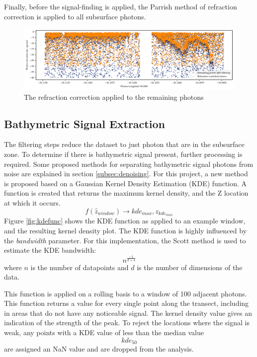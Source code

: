 Finally, before the signal-finding is applied, the Parrish method of refraction correction is applied to all subsurface photons.

\begin{figure}[htbp]
    \centering
    \includegraphics[width=\textwidth]{figures/methodology_refraction.pdf}
    \caption{The refraction correction applied to the remaining photons}
    \label{fig:refraction-photons}
\end{figure}

\subsection{Bathymetric Signal Extraction}\label{sec:kdesignalfinding}

The filtering steps reduce the dataset to just photon that are in the subsurface zone. To determine if there is bathymetric signal present, further processing is required. Some proposed methods for separating bathymetric signal photons from noise are explained in section \ref{subsec:denoising}. For this project, a new method is proposed based on a Gaussian Kernel Density Estimation (KDE) function. A function is created that returns the maximum kernel density, and the Z location at which it occurs. $$ f(\hat{z}_{window}) \rightarrow kde_{max},z_{kde_{max}} $$ Figure \ref{fig:kdefunc} shows the KDE function as applied to an example window, and the resulting kernel density plot. The KDE function is highly influenced by the \emph{bandwidth} parameter. For this implementation, the Scott method \parencite{Scott2015} is used to estimate the KDE bandwidth: $$ n^{\frac{-1}{d+4}} $$ where $n$ is the number of datapoints and $d$ is the number of dimensions of the data.

This function is applied on a rolling basis to a window of 100 adjacent photons. This function returns a value for every single point along the transect, including in areas that do not have any noticeable signal. The kernel density value gives an indication of the strength of the peak. To reject the locations where the signal is weak, any points with a KDE value of less than the median value $$ kde_{50} $$  are assigned an NaN value and are dropped from the analysis.

